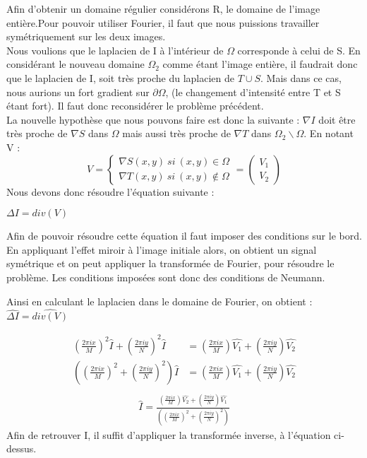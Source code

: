 Afin d'obtenir un domaine régulier considérons R, le domaine de l'image entière.Pour pouvoir utiliser Fourier, il faut que nous puissions travailler symétriquement sur les deux images.\\
Nous voulions que le laplacien de I à l'intérieur de $\Omega$ corresponde à celui de S. En considérant le nouveau domaine $\Omega_2$ comme étant l'image entière, il faudrait donc que le laplacien de I, soit très proche du laplacien de $T \cup S$. Mais dans ce cas, nous aurions un fort gradient sur $\partial \Omega$, (le  changement d'intensité entre T et S étant fort).  Il faut donc reconsidérer le problème précédent. \\
La nouvelle hypothèse que nous pouvons faire  est donc la suivante : $\nabla I$ doit être très proche de $\nabla S$ dans $\Omega$ mais aussi très proche de $\nabla T$ dans $\Omega_2 \backslash \Omega$. En notant V : 
\begin{equation}
V = 
\left\{
\begin{aligned}
\nabla S(x,y) \ si \ (x,y) \in \Omega\\
\nabla T(x,y) \ si \ (x,y) \notin \Omega
\end{aligned}
\right.
= \begin{pmatrix}
V_1\\
V_2
\end{pmatrix}
\end{equation}
Nous devons donc résoudre l'équation suivante : 
\begin{center}
$ \Delta I = div(V)$
\end{center}
Afin de pouvoir résoudre cette équation il faut imposer des conditions sur le bord. En appliquant l'effet miroir à l'image initiale alors, on obtient un signal symétrique  et on peut appliquer la transformée de Fourier, pour résoudre le problème.  Les conditions imposées sont donc des conditions de Neumann.

Ainsi en calculant le laplacien dans le domaine de Fourier, on obtient  : $\widehat{\Delta I} = \widehat{div(V)}$

\begin{equation}
\begin{aligned}
\left(\frac{2\pi i x}{M}\right)^2 \widehat{I}+\left(\frac{2\pi i y}{N}\right)^2 \widehat{I} & = \left(\frac{2\pi i x}{M}\right) \widehat{V_1}+\left(\frac{2\pi i y}{N}\right) \widehat{V_2}\\
\left(\left(\frac{2\pi i x}{M}\right)^2+\left(\frac{2\pi i y}{N}\right)^2\right) \widehat{I} & = \left(\frac{2\pi i x}{M}\right) \widehat{ V_1}+\left(\frac{2\pi i y}{N}\right) \widehat{V_2}\\
\end{aligned}
\end{equation}
\begin{equation}
\begin{aligned}
\widehat{I} = \frac{\left(\frac{2\pi i x}{M}\right) \widehat{ V_2}+\left(\frac{2\pi i y}{N}\right) \widehat{V_1}}{\left(\left(\frac{2\pi i x}{M}\right)^2+\left(\frac{2\pi i y}{N}\right)^2\right)}
\end{aligned}
\end{equation}
Afin de retrouver I, il suffit d'appliquer la transformée inverse, à l'équation ci-dessus.
